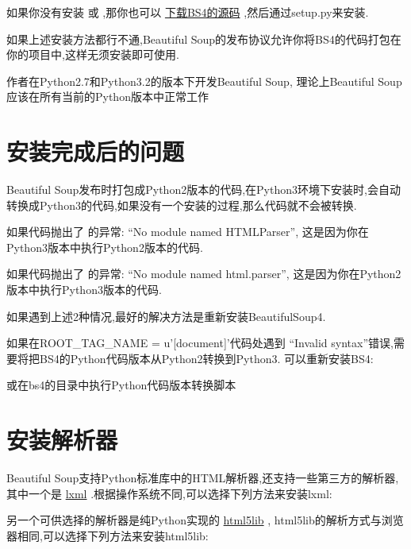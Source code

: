 \documentclass[letterpaper,12pt,english]{sphinxmanual}
\begin{document}
如果你没有安装  或  ,那你也可以 \href{http://www.crummy.com/software/BeautifulSoup/download/4.x/}{下载BS4的源码} ,然后通过setup.py来安装.


如果上述安装方法都行不通,Beautiful Soup的发布协议允许你将BS4的代码打包在你的项目中,这样无须安装即可使用.

作者在Python2.7和Python3.2的版本下开发Beautiful Soup, 理论上Beautiful Soup应该在所有当前的Python版本中正常工作


\section{安装完成后的问题}
\label{index:id11}
Beautiful Soup发布时打包成Python2版本的代码,在Python3环境下安装时,会自动转换成Python3的代码,如果没有一个安装的过程,那么代码就不会被转换.

如果代码抛出了  的异常: ``No module named HTMLParser'', 这是因为你在Python3版本中执行Python2版本的代码.

如果代码抛出了  的异常: ``No module named html.parser'', 这是因为你在Python2版本中执行Python3版本的代码.

如果遇到上述2种情况,最好的解决方法是重新安装BeautifulSoup4.

如果在ROOT\_TAG\_NAME = u'{[}document{]}'代码处遇到  ``Invalid syntax''错误,需要将把BS4的Python代码版本从Python2转换到Python3. 可以重新安装BS4:


或在bs4的目录中执行Python代码版本转换脚本



\section{安装解析器}
\label{index:id12}
Beautiful Soup支持Python标准库中的HTML解析器,还支持一些第三方的解析器,其中一个是 \href{http://lxml.de/}{lxml} .根据操作系统不同,可以选择下列方法来安装lxml:




另一个可供选择的解析器是纯Python实现的 \href{http://code.google.com/p/html5lib/}{html5lib} , html5lib的解析方式与浏览器相同,可以选择下列方法来安装html5lib:
\end{document}
